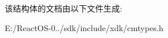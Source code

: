 该结构体的文档由以下文件生成\+:\begin{DoxyCompactItemize}
\item 
E\+:/\+React\+O\+S-\/0../sdk/include/xdk/cmtypes.\+h\end{DoxyCompactItemize}
